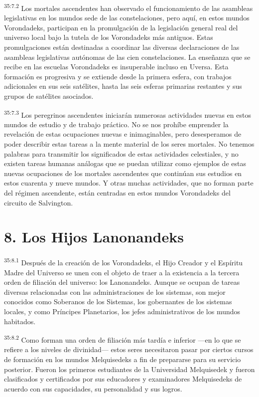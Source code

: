 \par
\textsuperscript{35:7.2} Los mortales ascendentes han observado el funcionamiento de las asambleas legislativas en los mundos sede de las constelaciones, pero aquí, en estos mundos Vorondadeks, participan en la promulgación de la legislación general real del universo local bajo la tutela de los Vorondadeks más antiguos. Estas promulgaciones están destinadas a coordinar las diversas declaraciones de las asambleas legislativas autónomas de las cien constelaciones. La enseñanza que se recibe en las escuelas Vorondadeks es insuperable incluso en Uversa. Esta formación es progresiva y se extiende desde la primera esfera, con trabajos adicionales en sus seis satélites, hasta las seis esferas primarias restantes y sus grupos de satélites asociados.

\par
\textsuperscript{35:7.3} Los peregrinos ascendentes iniciarán numerosas actividades nuevas en estos mundos de estudio y de trabajo práctico. No se nos prohíbe emprender la revelación de estas ocupaciones nuevas e inimaginables, pero desesperamos de poder describir estas tareas a la mente material de los seres mortales. No tenemos palabras para transmitir los significados de estas actividades celestiales, y no existen tareas humanas análogas que se puedan utilizar como ejemplos de estas nuevas ocupaciones de los mortales ascendentes que continúan sus estudios en estos cuarenta y nueve mundos. Y otras muchas actividades, que no forman parte del régimen ascendente, están centradas en estos mundos Vorondadeks del circuito de Salvington.

\section*{8. Los Hijos Lanonandeks}
\par
\textsuperscript{35:8.1} Después de la creación de los Vorondadeks, el Hijo Creador y el Espíritu Madre del Universo se unen con el objeto de traer a la existencia a la tercera orden de filiación del universo: los Lanonandeks. Aunque se ocupan de tareas diversas relacionadas con las administraciones de los sistemas, son mejor conocidos como Soberanos de los Sistemas, los gobernantes de los sistemas locales, y como Príncipes Planetarios, los jefes administrativos de los mundos habitados.

\par
\textsuperscript{35:8.2} Como forman una orden de filiación más tardía e inferior ---en lo que se refiere a los niveles de divinidad--- estos seres necesitaron pasar por ciertos cursos de formación en los mundos Melquisedeks a fin de prepararse para su servicio posterior. Fueron los primeros estudiantes de la Universidad Melquisedek y fueron clasificados y certificados por sus educadores y examinadores Melquisedeks de acuerdo con sus capacidades, su personalidad y sus logros.

